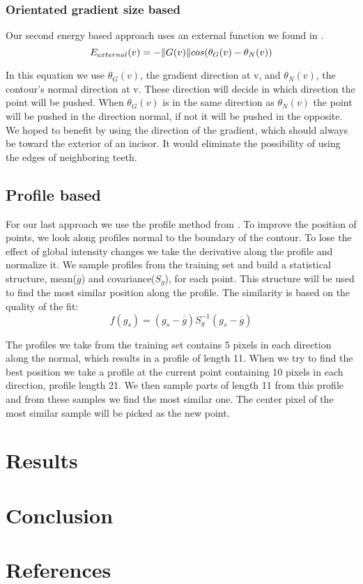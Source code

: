 \documentclass[a4paper,10pt]{article}
\begin{document}
\subsubsection{Orientated gradient size based}
Our second energy based approach uses an external function we found in \cite{OrientatedEnergy}. 
\begin{equation}
E_{external}(v) = -  \|G(v)\|cos(\theta_{G}(v) - \theta_{N}(v))\\
\end{equation}

In this equation we use $\theta_{G}(v)$, the gradient direction at v, and $\theta_{N}(v)$, the contour's normal direction at v. These direction will decide in which direction the point will be pushed. When $\theta_{G}(v)$ is in the same direction as  $\theta_{N}(v)$ the point will be pushed in the direction normal, if not it will be pushed in the opposite. We hoped to benefit by using the direction of the gradient, which should always be toward the exterior of an incisor. It would eliminate the possibility of using the edges of neighboring teeth.

\subsection{Profile based}\label{sec:fit_deriv}
For our last approach we use the profile method from \cite{TemplateAlgorithm}. To improve the position of points, we look along profiles normal to the boundary of the contour. To lose the effect of global intensity changes we take the derivative along the profile and normalize it. We sample profiles from the training set and build a statistical structure, mean($\overline{g}$) and covariance($S_{g}$), for each point. This structure will be used to find the most similar position along the profile. The similarity is based on the quality of the fit:
\begin{equation}
f(g_{s}) = (g_{s} - \overline{g}) S_{g}^{-1} (g_{s}-\overline{g})
\end{equation}

The profiles we take from the training set contains 5 pixels in each direction along the normal, which results in a profile of length 11. When we try to find the best position we take a profile at the current point containing 10 pixels in each direction, profile length 21. We then sample parts of length 11 from this profile and from these samples we find the most similar one. The center pixel of the most similar sample will be picked as the new point.

\section{Results}\label{sec:results}

\section{Conclusion}


\section{References}


\end{document}
